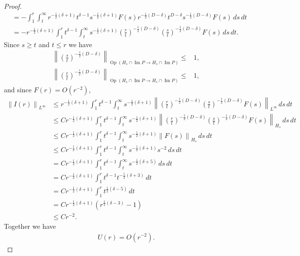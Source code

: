 \documentclass[a4paper,10pt,reqno]{amsart}
\theoremstyle{plain}
\numberwithin{equation}{section}
\begin{document}
\begin{proof}
\begin{align}
&=
- \int_1^r \int_t^\infty 
r^{-\frac{1}{2}(\delta +1)}
t^{\delta-1}
s^{-\frac{1}{2}(\delta+1)} F(s) 
r^{-\frac{1}{2}(D -\delta)}
t^{D-\delta}
s^{-\frac{1}{2}(D-\delta)} F(s) 
\, ds \, dt \nonumber \\
&=
- r^{-\frac{1}{2}(\delta +1)} \int_1^r 
t^{\delta-1} \int_t^\infty 
s^{-\frac{1}{2}(\delta+1)} 
\left( \frac{r}{t} \right)^{-\frac{1}{2}(D -\delta)}
\left( \frac{s}{t} \right)^{-\frac{1}{2}(D-\delta)} F(s) 
\, ds \, dt .
\end{align}
Since $s \geq t$ and $t \leq r$ we have
\begin{align}
\left\| \left(\frac{s}{t} \right)^{-\frac{1}{2} (D - \delta) }
\right\|_{\operatorname{Op}(H_s \cap \operatorname{Im}P
\to H_s \cap \operatorname{Im}P)}
\leq{}& 1, \\ 
%
\left\| \left(\frac{r}{t} \right)^{-\frac{1}{2} (D - \delta) }
\right\|_{\operatorname{Op}(H_s \cap \operatorname{Im}P
\to H_s \cap \operatorname{Im}P)}
\leq{}& 1,
\end{align}
and since $F(r) = O(r^{-2})$,
\begin{align}
\left\| I(r) \right\|_{L^\infty}
&\leq
r^{-\frac{1}{2}(\delta +1)} \int_1^r 
t^{\delta-1} \int_t^\infty 
s^{-\frac{1}{2}(\delta+1)} 
\left\|
\left( \frac{r}{t} \right)^{-\frac{1}{2}(D -\delta)}
\left( \frac{s}{t} \right)^{-\frac{1}{2}(D-\delta)} F(s) 
\right\|_{L^\infty}
\, ds \, dt \nonumber \\
&\leq
Cr^{-\frac{1}{2}(\delta +1)} \int_1^r 
t^{\delta-1} \int_t^\infty 
s^{-\frac{1}{2}(\delta+1)} 
\left\|
\left( \frac{r}{t} \right)^{-\frac{1}{2}(D -\delta)}
\left( \frac{s}{t} \right)^{-\frac{1}{2}(D-\delta)} F(s) 
\right\|_{H_s}
\, ds \, dt \nonumber \\
&\leq
Cr^{-\frac{1}{2}(\delta +1)} \int_1^r 
t^{\delta-1} \int_t^\infty 
s^{-\frac{1}{2}(\delta+1)} 
\left\| F(s) \right\|_{H_s}
\, ds \, dt \nonumber \\
&\leq
Cr^{-\frac{1}{2}(\delta +1)} \int_1^r 
t^{\delta-1} \int_t^\infty 
s^{-\frac{1}{2}(\delta+1)} s^{-2}
\, ds \, dt \nonumber \\
&=
Cr^{-\frac{1}{2}(\delta +1)} \int_1^r 
t^{\delta-1} \int_t^\infty 
s^{-\frac{1}{2}(\delta+5)}
\, ds \, dt \nonumber \\
&=
Cr^{-\frac{1}{2}(\delta +1)} \int_1^r 
t^{\delta-1} t^{-\frac{1}{2}(\delta+3)}
\, dt \nonumber \\
&=
Cr^{-\frac{1}{2}(\delta +1)} \int_1^r 
t^{\frac{1}{2}(\delta-5)}
\, dt \nonumber \\
&=
Cr^{-\frac{1}{2}(\delta +1)} 
\left( r^{\frac{1}{2}(\delta-3)} - 1 \right) \nonumber \\
&\leq 
Cr^{-2}. 
\end{align}
Together we have
\begin{align}
U(r) = O(r^{-2}).
\end{align}


\end{proof}
\end{document}
